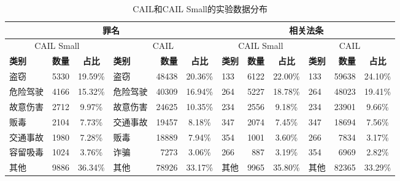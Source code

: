 \begin{table}[!htbp]
	\centering
	\begin{tabular}{lrc|lrc|lrc|lrc}
		\hline
		\multicolumn{6}{c|}{\textbf{罪名}} & \multicolumn{6}{|c}{\textbf{相关法条}}                                                                                                                                                                                \\
		\hline
		\multicolumn{3}{c|}{CAIL Small}  & \multicolumn{3}{|c}{CAIL}          & \multicolumn{3}{|c|}{CAIL Small} & \multicolumn{3}{|c}{CAIL}                                                                                                                 \\
		\hline
		\textbf{类别}                      & \textbf{数量}                        & \textbf{占比}                      & \textbf{类别}               & \textbf{数量} & \textbf{占比} & \textbf{类别} & \textbf{数量} & \textbf{占比} & \textbf{类别} & \textbf{数量} & \textbf{占比} \\
		\hline
		盗窃                               & 5330                               & 19.59\%                          & 盗窃                        & 48438       & 20.36\%     & 133         & 6122        & 22.00\%     & 133         & 59638       & 24.10\%     \\
		危险驾驶                             & 4166                               & 15.32\%                          & 危险驾驶                      & 40309       & 16.94\%     & 264         & 5227        & 18.78\%     & 264         & 48023       & 19.41\%     \\
		故意伤害                             & 2712                               & 9.97\%                           & 故意伤害                      & 24625       & 10.35\%     & 234         & 2556        & 9.18\%      & 234         & 23901       & 9.66\%      \\
		贩毒                               & 2104                               & 7.73\%                           & 交通事故                      & 19457       & 8.18\%      & 347         & 2074        & 7.45\%      & 347         & 18694       & 7.56\%      \\
		交通事故                             & 1980                               & 7.28\%                           & 贩毒                        & 18889       & 7.94\%      & 354         & 1001        & 3.60\%      & 266         & 7834        & 3.17\%      \\
		容留吸毒                             & 1024                               & 3.76\%                           & 诈骗                        & 7273        & 3.06\%      & 266         & 887         & 3.19\%      & 354         & 6969        & 2.82\%      \\
		其他                               & 9886                               & 36.34\%                          & 其他                        & 78926       & 33.17\%     & 其他          & 9965        & 35.80\%     & 其他          & 82365       & 33.29\%     \\
		\hline
	\end{tabular}
	\caption{CAIL和CAIL Small的实验数据分布}
	\label{tab:cail}
\end{table}
